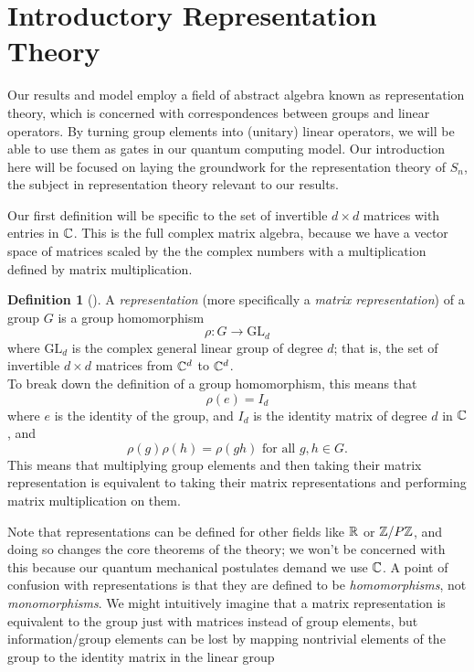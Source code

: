 \documentclass[12pt,twoside]{reedthesis}
\theoremstyle{plain}   %
\theoremstyle{definition}
\newtheorem{defn}{Definition}[section]
\theoremstyle{remark}
\numberwithin{equation}{section}
\def\GL{\mathrm{GL}} \def\SL{\mathrm{SL}}  \def\SP{\mathrm{SL}}\def\OG{\mathrm{O}}
\begin{document}
  \section{Introductory Representation Theory}
  Our results and model employ a field of abstract algebra known as representation theory, which is concerned with
  correspondences between groups and linear operators. By turning group elements into (unitary) linear operators, we will be able to use them as gates in our quantum computing model.
  Our introduction here will be focused on laying the groundwork for the representation theory of $S_n$, the subject in representation theory relevant to our results.
  \par
  Our first definition will be specific to the set of invertible $d \times d$ matrices with entries in $\mathbb{C}$.
  This is the full complex matrix algebra, because we have a vector space of matrices scaled by the the complex numbers
  with a multiplication defined by matrix multiplication.
  \begin{defn}[{\cite[Definition 1.2.1]{sagan}}]
    A \emph{representation} (more specifically a \emph{matrix representation}) of a group $G$ is a group homomorphism
    \[\rho: G \to \GL_d\]
    where $\GL_d$ is the complex general linear group of degree $d$; that is, the set of
    invertible $d \times d$ matrices from $\mathbb{C}^d$ to $\mathbb{C}^d$. \\
    To break down the definition of a group homomorphism, this means that
    \[ \rho(e) = I_d\]
    where $e$ is the identity of the group, and $I_d$ is the identity matrix of degree $d$ in $\mathbb{C}$, and
    \[\rho(g)\rho(h) = \rho(gh) \text{ for all $g,h \in G$.}\]
    This means that multiplying group elements and then taking their matrix representation is equivalent to
    taking their matrix representations and performing matrix multiplication on them.
  \end{defn}
  Note that representations can be defined for other fields like $\mathbb{R}$ or $\mathbb{Z}/P\mathbb{Z}$, and doing so changes the core theorems of the theory;
  we won't be concerned with this because our quantum mechanical postulates demand we use $\mathbb{C}$.
  A point of confusion with representations is that they are defined to be \emph{homomorphisms}, not \emph{monomorphisms}.
  We might intuitively imagine that a matrix representation is equivalent to the group just with matrices instead of group elements,
  but information/group elements can be lost by mapping nontrivial elements of the group to the identity matrix in the linear group
\end{document}
